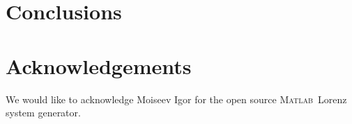 \documentclass{article}[11pt]
\newcommand{\Matlab}{\textsc{Matlab}}
\begin{document}

\section{Conclusions}
\label{sec:conclusion}


\section{Acknowledgements}
\label{sec:Ack}
We would like to acknowledge Moiseev Igor for the open source \Matlab \ Lorenz system generator.




\end{document}
